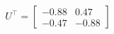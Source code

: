 \documentclass[preview]{standalone}
\begin{document}
\begin{align*}
U^\top=\left[\begin{matrix}-0.88&0.47\\-0.47&-0.88\end{matrix}\right]
\end{align*}
\end{document}
